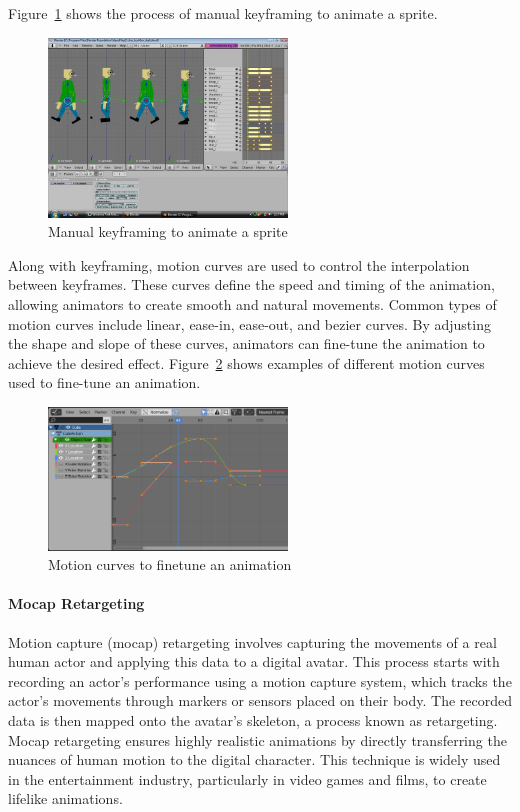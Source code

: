 \documentclass[../../main.tex]{subfiles}
\begin{document}
Figure~\ref{fig:keyframing} shows the process of manual keyframing to animate a sprite.

\begin{figure} 
  \centering \includegraphics[width = 2.5in]{chapters/background_work/images/keyframing.png} 
  \caption{Manual keyframing to animate a sprite} 
  \label{fig:keyframing} 
\end{figure}

Along with keyframing, motion curves\cite{10.1145/218380.218422} are used to control the interpolation between keyframes. These curves define the speed and timing of the animation, allowing animators to create smooth and natural movements. Common types of motion curves include linear, ease-in, ease-out, and bezier curves. By adjusting the shape and slope of these curves, animators can fine-tune the animation to achieve the desired effect. Figure~\ref{fig:motion_curves} shows examples of different motion curves used to fine-tune an animation.

\begin{figure} 
  \centering \includegraphics[width = 2.5in]{chapters/background_work/images/motion_curves.png} 
  \caption{Motion curves to finetune an animation} 
  \label{fig:motion_curves} 
\end{figure}

\paragraph{Mocap Retargeting}
\label{ch:background_work:sign_language_synthesis:3d_techniques:avatar_animation:mocap_retargeting}

Motion capture (mocap) retargeting involves capturing the movements of a real human actor and applying this data to a digital avatar. This process starts with recording an actor’s performance using a motion capture system, which tracks the actor’s movements through markers or sensors placed on their body. The recorded data is then mapped onto the avatar’s skeleton, a process known as retargeting. Mocap retargeting ensures highly realistic animations by directly transferring the nuances of human motion to the digital character. This technique is widely used in the entertainment industry, particularly in video games and films, to create lifelike animations.
\end{document}
